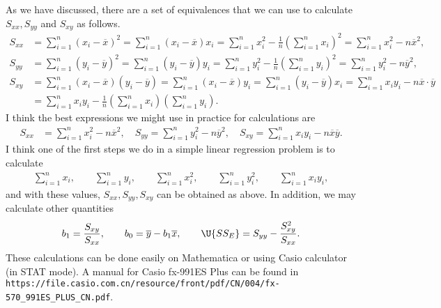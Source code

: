 As we have discussed, there are a set of equivalences that we can use to calculate $S_{xx}, S_{yy}$ and $S_{xy}$ as follows.
\begin{align*}
S_{xx} & = \sum_{i=1}^n (x_i - \overline{x})^2 = \sum_{i=1}^n (x_i - \overline{x})x_i = \sum_{i=1}^n x_i^2 - \frac{1}{n}\left(\sum_{i=1}^n x_i\right)^2  = \sum_{i=1}^n x_i^2 - n\overline{x}^2, \\
S_{yy} & = \sum_{i=1}^n (y_i - \overline{y})^2 = \sum_{i=1}^n (y_i - \overline{y})y_i = \sum_{i=1}^n y_i^2 - \frac{1}{n}\left(\sum_{i=1}^n y_i\right)^2 = \sum_{i=1}^n y_i^2 - n\overline{y}^2, \\
S_{xy} & = \sum_{i=1}^n (x_i - \overline{x})(y_i - \overline{y}) = \sum_{i=1}^n (x_i - \overline{x})y_i = \sum_{i=1}^n (y_i - \overline{y})x_i = \sum_{i=1}^n x_iy_i - n\overline{x}\cdot\overline{y} \\
& = \sum_{i=1}^n x_iy_i - \frac{1}{n}\left(\sum_{i=1}^n x_i \right)\left(\sum_{i=1}^n y_i \right).
\end{align*}
I think the best expressions we might use in practice for calculations are 
\begin{align*}
S_{xx} & = \sum_{i=1}^n x_i^2 - n\overline{x}^2, \quad S_{yy} = \sum_{i=1}^n y_i^2 - n\overline{y}^2, \quad S_{xy} = \sum_{i=1}^n x_iy_i - n\overline{x}\overline{y}.
\end{align*}
I think one of the first steps we do in a simple linear regression problem is to calculate
\begin{align*}
\sum_{i=1}^n x_i, \qquad \sum_{i=1}^n y_i, \qquad \sum_{i=1}^n x_i^2, \qquad \sum_{i=1}^n y_i^2, \qquad \sum_{i=1}^n x_iy_i,
\end{align*}
and with these values, $S_{xx}, S_{yy}, S_{xy}$ can be obtained as above. In addition, we may calculate other quantities
\begin{align*}
b_1 = \frac{S_{xy}}{S_{xx}}, \qquad b_0 = \overline{y} - b_1\overline{x}, \qquad \U{SS_E} = S_{yy} - \frac{S_{xy}^2}{S_{xx}}.
\end{align*}
These calculations can be done easily on Mathematica or using Casio calculator (in STAT mode). A manual for Casio fx-991ES Plus can be found in \\ \texttt{https://file.casio.com.cn/resource/front/pdf/CN/004/fx-570\_991ES\_PLUS\_CN.pdf}.

